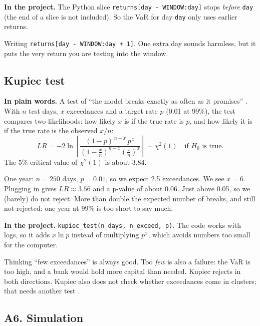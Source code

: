 \documentclass[11pt,a4paper]{article}
\newcommand{\term}[1]{\subsection{#1}}
\newcommand{\plain}{\textbf{In plain words.} }
\newcommand{\inproj}{\textbf{In the project.} }
\newcommand{\code}[1]{\texttt{#1}}
\begin{document}
\inproj The Python slice \code{returns[day - WINDOW:day]} stops \emph{before}
\code{day} (the end of a slice is not included). So the VaR for day
\code{day} only uses earlier returns.

\begin{mistake}
Writing \code{returns[day - WINDOW:day + 1]}. One extra day sounds harmless,
but it puts the very return you are testing into the window.
\end{mistake}

\term{Kupiec test}\label{g:kupiec}
\plain A test of ``the model breaks exactly as often as it promises''
\citep{kupiec1995}. With $n$ test days, $x$ exceedances and a target
rate $p$ (0.01 at 99\%), the test compares two likelihoods: how likely $x$
is if the true rate is $p$, and how likely it is if the true rate is the
observed $x/n$:
\[
  LR = -2\ln\!\left[\frac{(1-p)^{\,n-x}\,p^{\,x}}
       {\left(1-\frac{x}{n}\right)^{n-x}\left(\frac{x}{n}\right)^{x}}\right]
  \sim \chi^2(1) \quad \text{if } H_0 \text{ is true.}
\]
The 5\% critical value of $\chi^2(1)$ is about 3.84.

\begin{example}
One year: $n=250$ days, $p=0.01$, so we expect 2.5 exceedances. We see
$x=6$. Plugging in gives $LR \approx 3.56$ and a p-value of about 0.06. Just
above 0.05, so we (barely) do not reject. More than double the expected
number of breaks, and still not rejected: one year at 99\% is too short to
say much.
\end{example}

\inproj \code{kupiec\_test(n\_days, n\_exceed, p)}. The code works with
logs, so it adds $x\ln p$ instead of multiplying $p^x$, which avoids numbers
too small for the computer.

\begin{mistake}
Thinking ``few exceedances'' is always good. Too \emph{few} is also a
failure: the VaR is too high, and a bank would hold more capital than needed.
Kupiec rejects in both directions. Kupiec also does not check whether
exceedances come in clusters; that needs another test
\citep{christoffersen1998}.
\end{mistake}

\subsection*{A6. Simulation}
\end{document}
